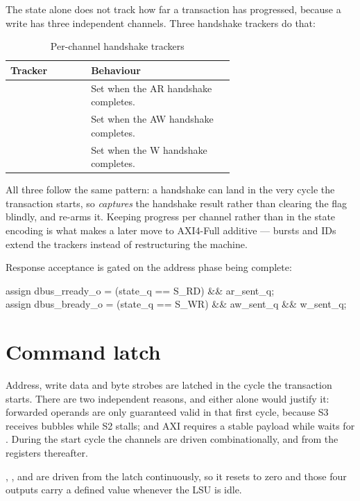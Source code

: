 The state alone does not track how far a transaction has progressed, because a
write has three independent channels. Three handshake trackers do that:

\begin{table}[H]
\centering
\caption{Per-channel handshake trackers}
\label{tab:lsutrack}
\begin{tabular}{@{}lL{0.64\linewidth}@{}}
\toprule
\textbf{Tracker} & \textbf{Behaviour} \\
\midrule
{} & Set when the AR handshake completes. \\
 & Set when the AW handshake completes. \\
  & Set when the W handshake completes. \\
\bottomrule
\end{tabular}
\end{table}

All three follow the same pattern: a handshake can land in the very cycle the
transaction starts, so  \emph{captures} the handshake result rather
than clearing the flag blindly, and  re-arms it. Keeping progress per
channel rather than in the state encoding is what makes a later move to AXI4-Full
additive --- bursts and IDs extend the trackers instead of restructuring the
machine.

Response acceptance is gated on the address phase being complete:

\begin{center}
\ttfamily\small
assign dbus\_rready\_o = (state\_q == S\_RD) \&\& ar\_sent\_q;\\
assign dbus\_bready\_o = (state\_q == S\_WR) \&\& aw\_sent\_q \&\& w\_sent\_q;
\end{center}

\section{Command latch}

Address, write data and byte strobes are latched in the cycle the transaction
starts. There are two independent reasons, and either alone would justify it:
forwarded operands are only guaranteed valid in that first cycle, because S3
receives bubbles while S2 stalls; and AXI requires a stable payload while
 waits for . During the start cycle the channels are driven
combinationally, and from the registers thereafter.

, ,  and  are driven from the
latch continuously, so it resets to zero and those four outputs carry a defined
value whenever the LSU is idle.

